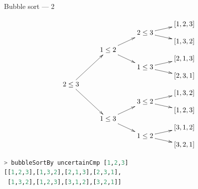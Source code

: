\documentclass[handout]{beamer}
\begin{document}
\begin{frame}[fragile]{Bubble sort --- 2}

\vspace{-4ex}

$$\xymatrix@R-2.2pc{
                             &                          &                        & [1,2,3] \\
                             &                          & 2 \le 3 \ar[ur]\ar[dr] &         \\
                             &                          &                        & [1,3,2] \\
                             & 1 \le 2 \ar[uur]\ar[ddr] &                        &         \\
                             &                          &                        & [2,1,3] \\
                             &                          & 1 \le 3 \ar[ur]\ar[dr] &         \\
                             &                          &                        & [2,3,1] \\
2 \le 3 \ar[uuuur]\ar[ddddr] &                          &                        &         \\
                             &                          &                        & [1,3,2] \\
                             &                          & 3 \le 2 \ar[ur]\ar[dr] &         \\
                             &                          &                        & [1,2,3] \\
                             & 1 \le 3 \ar[uur]\ar[ddr] &                        &         \\
                             &                          &                        & [3,1,2] \\
                             &                          & 1 \le 2 \ar[ur]\ar[dr] &         \\
                             &                          &                        & [3,2,1] \\
}$$

\vspace{-3ex}

\begin{lstlisting}[language=Haskell]
> bubbleSortBy uncertainCmp [1,2,3]
[[1,2,3],[1,3,2],[2,1,3],[2,3,1],
 [1,3,2],[1,2,3],[3,1,2],[3,2,1]]
\end{lstlisting}

\end{frame}
\end{document}
